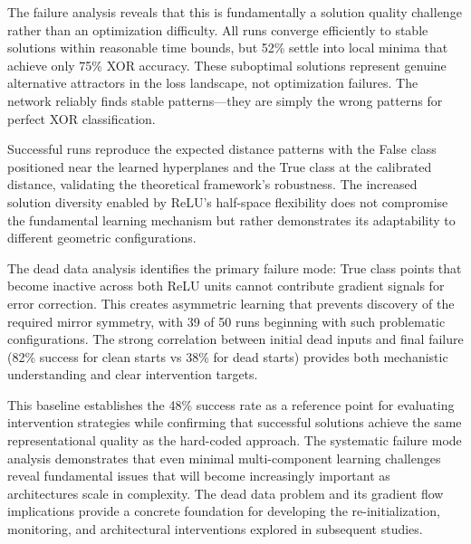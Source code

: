 The failure analysis reveals that this is fundamentally a solution quality challenge rather than an optimization difficulty. All runs converge efficiently to stable solutions within reasonable time bounds, but 52\% settle into local minima that achieve only 75\% XOR accuracy. These suboptimal solutions represent genuine alternative attractors in the loss landscape, not optimization failures. The network reliably finds stable patterns—they are simply the wrong patterns for perfect XOR classification.

Successful runs reproduce the expected distance patterns with the False class positioned near the learned hyperplanes and the True class at the calibrated distance, validating the theoretical framework's robustness. The increased solution diversity enabled by ReLU's half-space flexibility does not compromise the fundamental learning mechanism but rather demonstrates its adaptability to different geometric configurations.

The dead data analysis identifies the primary failure mode: True class points that become inactive across both ReLU units cannot contribute gradient signals for error correction. This creates asymmetric learning that prevents discovery of the required mirror symmetry, with 39 of 50 runs beginning with such problematic configurations. The strong correlation between initial dead inputs and final failure (82\% success for clean starts vs 38\% for dead starts) provides both mechanistic understanding and clear intervention targets.

This baseline establishes the 48\% success rate as a reference point for evaluating intervention strategies while confirming that successful solutions achieve the same representational quality as the hard-coded approach. The systematic failure mode analysis demonstrates that even minimal multi-component learning challenges reveal fundamental issues that will become increasingly important as architectures scale in complexity. The dead data problem and its gradient flow implications provide a concrete foundation for developing the re-initialization, monitoring, and architectural interventions explored in subsequent studies.
